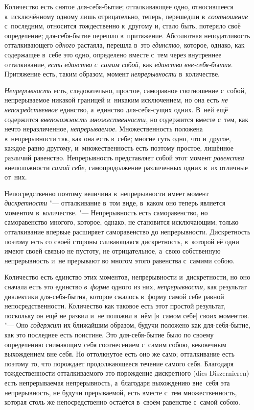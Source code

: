 

Количество есть снятое для-себя-бытие; отталкивающее одно, относившееся
к~исключённому одному лишь отрицательно, теперь, перешедши в~{\em соотношение}
с~последним, относится тождественно к~другому и, стало быть, потеряло своё
определение; для-себя-бытие перешло в~притяжение. Абсолютная неподатливость
отталкивающего {\em одного} растаяла, перешла в~это {\em единство,} которое,
однако, как содержащее в~себе это одно, определено вместе с~тем через
внутреннее отталкивание, {\em есть единство с~самим собой,} как
{\em единство вне-себя-бытия}. Притяжение есть, таким образом, момент
{\em непрерывности} в~количестве.

{\em Непрерывность} есть, следовательно, простое, саморавное соотношение
с~собой, непрерываемое никакой границей и~никаким исключением, но она есть
{\em не непосредственное} единство, а~единство для-себя-сущих одних. В~ней
ещё содержится {\em внеположность множественности,} но содержится вместе
с~тем, как нечто неразличенное, {\em непрерываемое}. Множественность положена
в~непрерывности так, как она есть в~себе; многие суть одно, что и~другое,
каждое равно другому, и~множественность есть поэтому простое, лишённое
различий равенство. Непрерывность представляет собой этот момент
{\em равенства} внеположности {\em самой себе,} самопродолжение различенных
одних в~их отличные от~них.

Непосредственно поэтому величина в~непрерывности имеет момент
{\em дискретности} "--- отталкивание в~том виде, в~каком оно теперь является
моментом в~количестве. "--- Непрерывность есть саморавенство, но саморавенство
многого, которое, однако, не становится исключающим; только отталкивание
впервые расширяет саморавенство до непрерывности. Дискретность поэтому есть
со своей стороны сливающаяся дискретность, в~которой её одни имеют своей связью
не пустоту, не отрицательное, а~свою собственную непрерывность и~не прерывают
во многом этого равенства с~самими собою.

Количество есть единство этих моментов, непрерывности и~дискретности, но оно
сначала есть это единство {\em в~форме} одного из них, {\em непрерывности,} как
результат диалектики для-себя-бытия, которое сжалось в~форму самой себе равной
непосредственности. Количество как таковое есть этот простой результат,
поскольку он ещё не развил и~не положил в~нём [в~самом себе] своих моментов.
"--- Оно {\em содержит} их ближайшим образом, будучи положено как
для-себя-бытие, как это последнее есть поистине. Это для-себя-бытие было по
своему определению снимающим себя соотнесением с~самим собою, вековечным
выхождением вне себя. Но оттолкнутое есть оно же само; отталкивание есть
поэтому то, что порождает продолжающееся течение самого себя. Благодаря
тождественности отталкиваемого это порождение дискретного (dies
Dis\-zer\-nie\-ren) есть непрерываемая непрерывность, а~благодаря выхождению
вне~себя эта непрерывность, не будучи прерываемой, есть вместе с~тем
множественность, которая столь же непосредственно остаётся в~своём равенстве
с~самой собою.

